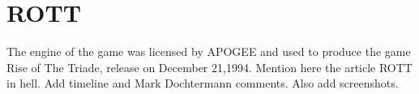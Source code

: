 \section{ROTT}

The engine of the game was licensed by APOGEE and used to produce the game Rise of The Triade, release on December 21,1994.
Mention here the article ROTT in hell. Add timeline and Mark Dochtermann comments.
Also add screenshots.